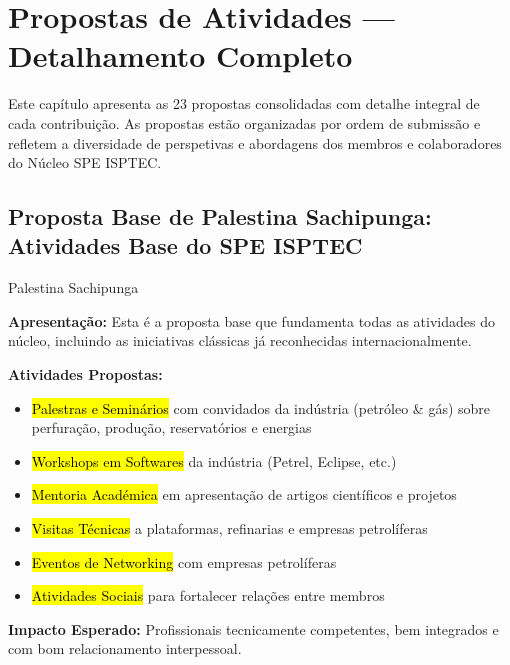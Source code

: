 \documentclass[12pt,a4paper,oneside]{article}
\begin{document}
\newpage


\section{Propostas de Atividades — Detalhamento Completo}

\noindent Este capítulo apresenta as 23 propostas consolidadas com detalhe integral de cada contribuição. As propostas estão organizadas por ordem de submissão e refletem a diversidade de perspetivas e abordagens dos membros e colaboradores do Núcleo SPE ISPTEC.

\subsection{Proposta Base de Palestina Sachipunga: Atividades Base do SPE ISPTEC}

\begin{proposalbox}{Palestina Sachipunga}

\textbf{Apresentação:} Esta é a proposta base que fundamenta todas as atividades do núcleo, incluindo as iniciativas clássicas já reconhecidas internacionalmente.

\medskip

\textbf{Atividades Propostas:}

\begin{itemize}[label={\color{spe-secondary}$\bullet$}]
  \item \hl{Palestras e Seminários} com convidados da indústria (petróleo \& gás) sobre perfuração, produção, reservatórios e energias
  \item \hl{Workshops em Softwares} da indústria (Petrel, Eclipse, etc.)
  \item \hl{Mentoria Académica} em apresentação de artigos científicos e projetos
  \item \hl{Visitas Técnicas} a plataformas, refinarias e empresas petrolíferas
  \item \hl{Eventos de Networking} com empresas petrolíferas
  \item \hl{Atividades Sociais} para fortalecer relações entre membros
\end{itemize}

\medskip

\textbf{Impacto Esperado:} Profissionais tecnicamente competentes, bem integrados e com bom relacionamento interpessoal.

\end{proposalbox}
\end{document}
